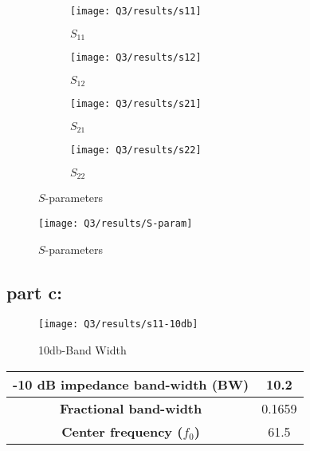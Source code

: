 \documentclass[12pt,onecolumn,a4paper]{article}
\begin{document}
	
	\begin{figure}[H]
		\centering
		\begin{subfigure}{.45\linewidth}
			\centering
			\texttt{[image: Q3/results/s11]}
			\caption{$S_{11}$}
			\label{fig:s11}
		\end{subfigure}
		\hfill
		\begin{subfigure}{.45\linewidth}
			\centering
			\texttt{[image: Q3/results/s12]}
			\caption{$S_{12}$}
			\label{fig:s12}
		\end{subfigure}
		
		\begin{subfigure}{.45\linewidth}
			\centering
			\texttt{[image: Q3/results/s21]}
			\caption{$S_{21}$}
			\label{fig:s21}
		\end{subfigure}
		\hfill
		\begin{subfigure}{.45\linewidth}
			\centering
			\texttt{[image: Q3/results/s22]}
			\caption{$S_{22}$}
			\label{fig:s22}
		\end{subfigure}
		\caption{$S$-parameters}
		\label{fig:S-parametes}
	\end{figure}	
	
	
	
	\begin{figure}[H]
	\centering
	\texttt{[image: Q3/results/S-param]}
	\caption{$S$-parameters}
	\label{fig:S-param}
	\end{figure}


	
	\FloatBarrier
	\subsection{part c:}
	
	
	\begin{figure}[H]
		\centering
		\texttt{[image: Q3/results/s11-10db]}
		\caption{10db-Band Width}
		\label{fig:s11-10db}
	\end{figure}
	
	\begin{table}[H]
		\centering
		\begin{tabular}{cc}
			\toprule
			\textbf{-10 dB impedance band-width (BW)} & 10.2 \\ \midrule		
			\textbf{Fractional band-width} & 0.1659 \\ \midrule
			\textbf{Center frequency ($f_0$)}                & 61.5   \\ 
			\bottomrule
		\end{tabular}
	\end{table}
	
\end{document}
